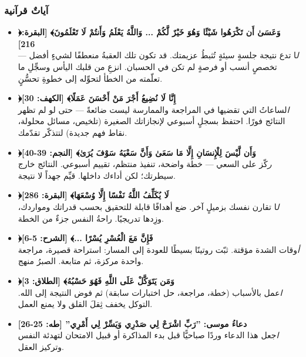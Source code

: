 \documentclass[12pt,a4paper]{book}
\begin{document}
	\subsubsection*{آياتٌ قرآنية}
	\begin{itemize}
		\item \textbf{﴿وَعَسَىٰ أَن تَكْرَهُوا شَيْئًا وَهُوَ خَيْرٌ لَّكُمْ ... وَاللَّهُ يَعْلَمُ وَأَنتُمْ لَا تَعْلَمُونَ﴾ \textnormal{[البقرة: 216]}}\\
		\textit لا تدع نتيجة جلسةٍ سيئةٍ تُثبطُ عزيمتك. قد تكون تلك العقبةُ منعطفًا لشيءٍ أفضل — تخصصٍ أنسب أو فرصةٍ لم تكن في الحسبان. انزعِ من قلبك اليأس وسجِّلِ ما تعلّمته من الخطأ لتحوِّله إلى خطوةِ تحسُّنٍ.
		
		\item \textbf{﴿إِنَّا لَا نُضِيعُ أَجْرَ مَنْ أَحْسَنَ عَمَلًا﴾ \textnormal{[الكهف: 30]}}\\
		\textit الساعاتُ التي تقضيها في المراجعة والممارسة ليست ضائعةً — حتى لو لم تظهر النتائج فورًا. احتفظ بسجلٍ أسبوعي لإنجازاتك الصغيرة (تلخيص، مسائل محلولة، نقاط فهم جديدة) لتتذكّر تقدّمك.
		
		\item \textbf{﴿وَأَن لَّيْسَ لِلْإِنسَانِ إِلَّا مَا سَعَىٰ وَأَنَّ سَعْيَهُ سَوْفَ يُرَىٰ﴾ \textnormal{[النجم: 39-40]}}\\
		\textit ركّز على السعي — خطة واضحة، تنفيذ منتظم، تقييم أسبوعي. النتائج خارج سيطرتك؛ لكن أداءك داخلها. قيِّم جهداً لا نتيجة.
		
		\item \textbf{﴿لَا يُكَلِّفُ اللَّهُ نَفْسًا إِلَّا وُسْعَهَا﴾ \textnormal{[البقرة: 286]}}\\
		\textit لا تقارن نفسك بزميلٍ آخر. ضع أهدافًا قابلة للتحقيق بحسب قدراتك ومواردك، وزِدها تدريجيًا. راحةُ النفس جزءٌ من الخطة.
		
		\item \textbf{﴿فَإِنَّ مَعَ الْعُسْرِ يُسْرًا ...﴾ \textnormal{[الشرح: 5-6]}}\\
		\textit أوقات الشدة مؤقتة. ثبّت روتينًا بسيطًا للعودة إلى المسار: استراحة قصيرة، مراجعة واحدة مركزة، ثم متابعة. الصبرُ منهج.
		
		\item \textbf{﴿وَمَن يَتَوَكَّلْ عَلَى اللَّهِ فَهُوَ حَسْبُهُ﴾ \textnormal{[الطلاق: 3]}}\\
		\textit اعمل بالأسباب (خطة، مراجعة، حل اختبارات سابقة) ثم فوض النتيجة إلى الله. التوكل يخفف ثِقلَ القلق ولا يمنع العمل.
		
		\item \textbf{دعاءُ موسى: \textnormal{''رَبِّ اشْرَحْ لِي صَدْرِي وَيَسِّرْ لِي أَمْرِي''} \textnormal{[طه: 25-26]}}\\
		\textit اجعل هذا الدعاء وردًا صباحيًّا قبل بدء المذاكرة أو قبيل الامتحان لتهدئة النفس وتركيز العقل.
	\end{itemize}
	
\end{document}
